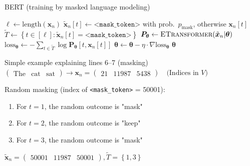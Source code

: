 \documentclass[12pt,aspectratio=169,handout]{beamer}
\begin{document}
\begin{frame}{BERT (training by masked language modeling)}




\begin{minipage}[t][10cm][t]{15cm}
\begin{algorithmic}[1]
	\State $\ell \gets \text{length}(\bm{x}_n)$
	\State $\tilde{\bm{x}}_n[t] \gets \texttt{<mask\_token>}$ with prob.\ $p_{\text{mask}}$, otherwise $\bm{x}_n[t]$
	\EndFor
	\State $\tilde{T} \gets \left\{ t \in [\ell] : \tilde{\bm{x}}_n[t] = \texttt{<mask\_token>} \right\}$
	\State $\bm{P_{\theta}} \gets \textsc{ETransformer}(\tilde{\bm{x}}_n | \bm{\theta})$
	\State $\text{loss}_{\bm{\theta}} \gets - \sum_{t \in \tilde{T}} \log \bm{P_{\theta}} [t, \bm{x}_n[t]] $
	\State $\bm{\theta} \gets \bm{\theta} - \eta \cdot \nabla \text{loss}_{\bm{\theta}}$
\EndFor
\EndFor
\State \Return $\bm{\theta}$
\EndFunction
\end{algorithmic}

\end{minipage}
\end{frame}




\begin{frame}{Simple example explaining lines 6--7 (masking)}
$
\begin{pmatrix}
	\text{The} &
	\text{cat} &
	\text{sat}
\end{pmatrix}
\rightarrow
\bm{x}_n =
\begin{pmatrix}
	21 &
	11987 &
	5438
\end{pmatrix}
\quad \text{(Indices in $V$)}
$

Random masking (index of \texttt{<mask\_token>} = 50001):
\begin{enumerate}
\item For $t = 1$, the random outcome is "mask"
\item For $t = 2$, the random outcome is "keep"
\item For $t = 3$, the random outcome is "mask"
\end{enumerate}
$
\bm{\tilde{x}}_n =
\begin{pmatrix}
	50001 &
	11987 &
	50001
\end{pmatrix},
\tilde{T} = \left\{ 1, 3 \right\}
$

	
	
\end{frame}
\end{document}
